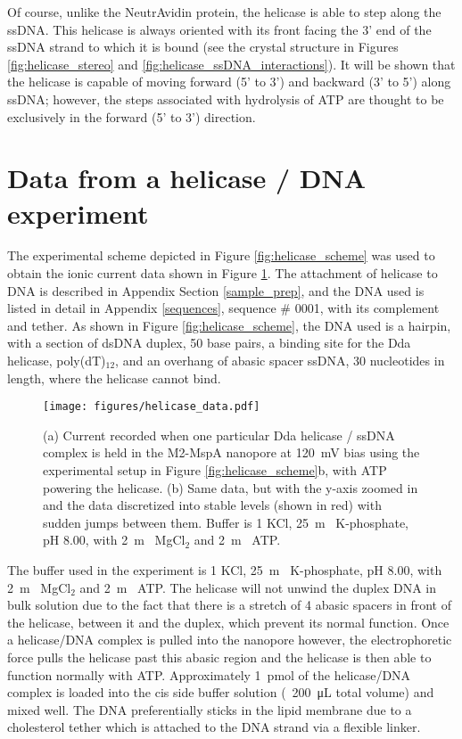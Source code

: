 Of course, unlike the NeutrAvidin protein, the helicase is able to step along the ssDNA.  This helicase is always oriented with its front facing the 3’ end of the ssDNA strand to which it is bound (see the crystal structure in Figures \ref{fig:helicase_stereo} and \ref{fig:helicase_ssDNA_interactions}).  It will be shown that the helicase is capable of moving forward (5’ to 3’) and backward (3’ to 5’) along ssDNA; however, the steps associated with hydrolysis of ATP are thought to be exclusively in the forward (5’ to 3’) direction.

\section{Data from a helicase / DNA experiment}

The experimental scheme depicted in Figure \ref{fig:helicase_scheme} was used to obtain the ionic current data shown in Figure \ref{fig:helicase_data}.  The attachment of helicase to DNA is described in Appendix Section \ref{sample_prep}, and the DNA used is listed in detail in Appendix \ref{sequences}, sequence \# 0001, with its complement and tether.  As shown in Figure \ref{fig:helicase_scheme}, the DNA used is a hairpin, with a section of dsDNA duplex, \num{50} base pairs, a binding site for the Dda helicase, poly(dT)$_{12}$, and an overhang of abasic spacer ssDNA, \num{30} nucleotides in length, where the helicase cannot bind.

\begin{figure}[H]
\begin{centering}
\texttt{[image: figures/helicase\_data.pdf]}
\caption[Data for helicase stepping along DNA]{(a) Current recorded when one particular Dda helicase / ssDNA complex is held in the M2-MspA nanopore at \SI{120}{\mV} bias using the experimental setup in Figure \ref{fig:helicase_scheme}b, with ATP powering the helicase.  (b) Same data, but with the y-axis zoomed in and the data discretized into stable levels (shown in red) with sudden jumps between them.  Buffer is \SI{1}{\Molar} KCl, \SI{25}{\m\Molar} K-phosphate, pH \num{8.00}, with \SI{2}{\m\Molar} MgCl$_2$ and \SI{2}{\m\Molar} ATP.}
\label{fig:helicase_data}
\end{centering}
\end{figure}

The buffer used in the experiment is \SI{1}{\Molar} KCl, \SI{25}{\m\Molar} K-phosphate, pH \num{8.00}, with \SI{2}{\m\Molar} MgCl$_2$ and \SI{2}{\m\Molar} ATP.  The helicase will not unwind the duplex DNA in bulk solution due to the fact that there is a stretch of \num{4} abasic spacers in front of the helicase, between it and the duplex, which prevent its normal function.  Once a helicase/DNA complex is pulled into the nanopore however, the electrophoretic force pulls the helicase past this abasic region and the helicase is then able to function normally with ATP.  Approximately \SI{1}{\pico\mol} of the helicase/DNA complex is loaded into the cis side buffer solution (~\SI{200}{\micro\liter} total volume) and mixed well.  The DNA preferentially sticks in the lipid membrane due to a cholesterol tether which is attached to the DNA strand via a flexible linker.

